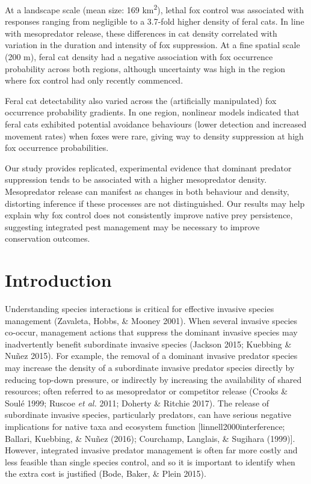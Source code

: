 \documentclass[11pt,a4paper,titlepage,twoside,openright]{style/unimelbthesis}
\begin{document}
\begin{mainmatter}
At a landscape scale (mean size: 169 km\textsuperscript{2}), lethal fox control was associated with responses ranging from negligible to a 3.7-fold higher density of feral cats. In line with mesopredator release, these differences in cat density correlated with variation in the duration and intensity of fox suppression. At a fine spatial scale (200 m), feral cat density had a negative association with fox occurrence probability across both regions, although uncertainty was high in the region where fox control had only recently commenced.

Feral cat detectability also varied across the (artificially manipulated) fox occurrence probability gradients. In one region, nonlinear models indicated that feral cats exhibited potential avoidance behaviours (lower detection and increased movement rates) when foxes were rare, giving way to density suppression at high fox occurrence probabilities.

Our study provides replicated, experimental evidence that dominant predator suppression tends to be associated with a higher mesopredator density. Mesopredator release can manifest as changes in both behaviour and density, distorting inference if these processes are not distinguished. Our results may help explain why fox control does not consistently improve native prey persistence, suggesting integrated pest management may be necessary to improve conservation outcomes.

\newpage

\hypertarget{introduction-2}{%
\section{Introduction}\label{introduction-2}}

Understanding species interactions is critical for effective invasive species management (Zavaleta, Hobbs, \& Mooney 2001). When several invasive species co-occur, management actions that suppress the dominant invasive species may inadvertently benefit subordinate invasive species (Jackson 2015; Kuebbing \& Nuñez 2015). For example, the removal of a dominant invasive predator species may increase the density of a subordinate invasive predator species directly by reducing top-down pressure, or indirectly by increasing the availability of shared resources; often referred to as mesopredator or competitor release (Crooks \& Soulé 1999; Ruscoe \emph{et al.} 2011; Doherty \& Ritchie 2017). The release of subordinate invasive species, particularly predators, can have serious negative implications for native taxa and ecosystem function {[}linnell2000interference; Ballari, Kuebbing, \& Nuñez (2016); Courchamp, Langlais, \& Sugihara (1999){]}. However, integrated invasive predator management is often far more costly and less feasible than single species control, and so it is important to identify when the extra cost is justified (Bode, Baker, \& Plein 2015).


\end{mainmatter}
\end{document}
